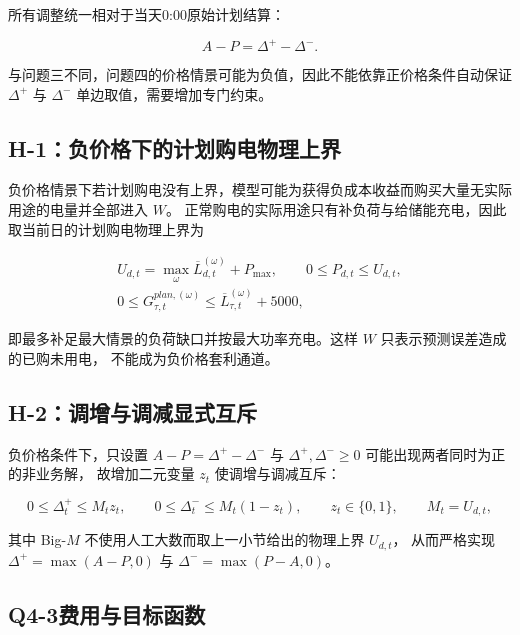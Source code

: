 所有调整统一相对于当天0:00原始计划结算：

\begin{equation}
A-P
=
\Delta^+-\Delta^-.
\end{equation}

与问题三不同，问题四的价格情景可能为负值，因此不能依靠正价格条件自动保证 \(\Delta^+\) 与 \(\Delta^-\) 单边取值，需要增加专门约束。

\subsection{H-1：负价格下的计划购电物理上界}

负价格情景下若计划购电没有上界，模型可能为获得负成本收益而购买大量无实际用途的电量并全部进入 \(W\)。
正常购电的实际用途只有补负荷与给储能充电，因此取当前日的计划购电物理上界为

\begin{equation}
\begin{gathered}
U_{d,t}=\max_{\omega}\overline L_{d,t}^{(\omega)}+P_{\max},
\qquad0\le P_{d,t}\le U_{d,t},\\
0\le G_{\tau,t}^{plan,(\omega)}\le\overline L_{\tau,t}^{(\omega)}+5000,
\end{gathered}
\end{equation}

即最多补足最大情景的负荷缺口并按最大功率充电。这样 \(W\) 只表示预测误差造成的已购未用电，
不能成为负价格套利通道。

\subsection{H-2：调增与调减显式互斥}

负价格条件下，只设置 \(A-P=\Delta^+-\Delta^-\) 与 \(\Delta^+,\Delta^-\ge0\) 可能出现两者同时为正的非业务解，
故增加二元变量 \(z_t\) 使调增与调减互斥：

\begin{equation}
0\le\Delta_t^+\le M_tz_t,
\qquad0\le\Delta_t^-\le M_t(1-z_t),
\qquad
z_t\in\{0,1\},
\qquad
M_t=U_{d,t},
\end{equation}

其中 Big-\(M\) 不使用人工大数而取上一小节给出的物理上界 \(U_{d,t}\)，
从而严格实现 \(\Delta^+=\max(A-P,0)\) 与 \(\Delta^-=\max(P-A,0)\)。

\subsection{Q4-3费用与目标函数}

